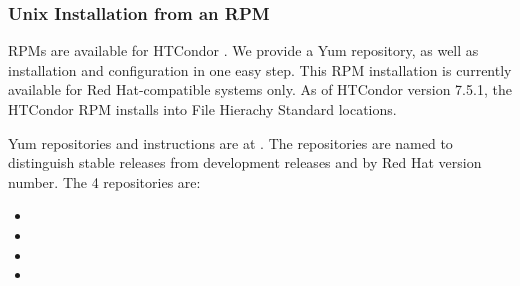 \subsubsection{\label{sec:install-rpms}
Unix Installation from an RPM}

RPMs are available for HTCondor \VersionNotice.
We provide a Yum repository, as well as 
installation and configuration in one easy step.
This RPM installation is currently available for Red Hat-compatible
systems only.
As of HTCondor version 7.5.1, 
the HTCondor RPM installs into File Hierachy Standard locations.

Yum repositories and instructions are at
  .
The repositories are named to distinguish stable releases from
development releases and by Red Hat version number. 
The 4 repositories are:
\begin{itemize}
  \item {}
  \item {}
  \item {}
  \item {}
\end{itemize}

